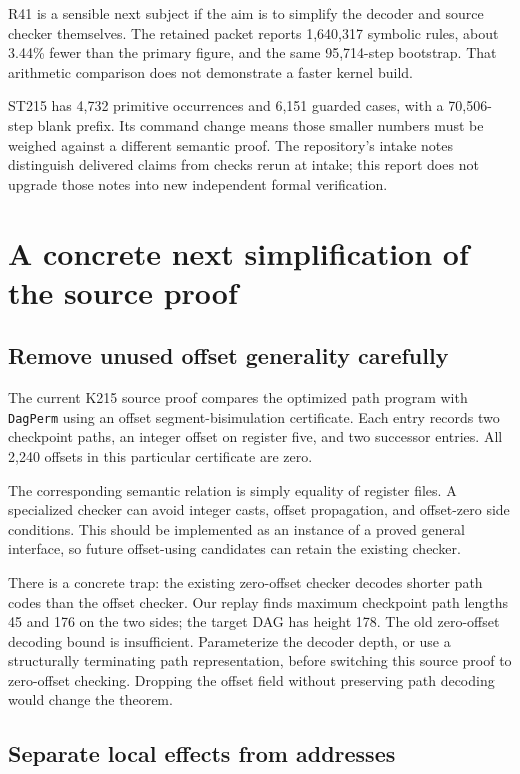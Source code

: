 \documentclass[11pt,letterpaper]{article}
\theoremstyle{definition}
\begin{document}
R41 is a sensible next subject if the aim is to simplify the decoder and
source checker themselves. The retained packet reports 1,640,317 symbolic
rules, about 3.44\% fewer than the primary figure, and the same 95,714-step
bootstrap. That arithmetic comparison does not demonstrate a faster
kernel build.\cite{rebalanced}

ST215 has 4,732 primitive occurrences and 6,151 guarded cases, with a
70,506-step blank prefix. Its command change means those smaller numbers
must be weighed against a different semantic proof. The repository's
intake notes distinguish delivered claims from checks rerun at intake;
this report does not upgrade those notes into new independent formal
verification.\cite{directtransfer,commands120,zerospare}

\section{A concrete next simplification of the source proof}

\subsection{Remove unused offset generality carefully}

The current K215 source proof compares the optimized path program with
\texttt{DagPerm} using an offset segment-bisimulation certificate. Each
entry records two checkpoint paths, an integer offset on register five,
and two successor entries. All 2,240 offsets in this particular
certificate are zero.\cite{sourceproof}

The corresponding semantic relation is simply equality of register
files. A specialized checker can avoid integer casts, offset propagation,
and offset-zero side conditions. This should be implemented as an
instance of a proved general interface, so future offset-using candidates
can retain the existing checker.

There is a concrete trap: the existing zero-offset checker decodes shorter
path codes than the offset checker. Our replay finds maximum checkpoint
path lengths 45 and 176 on the two sides; the target DAG has height 178.
The old zero-offset decoding bound is insufficient. Parameterize the
decoder depth, or use a structurally terminating path representation,
before switching this source proof to zero-offset checking. Dropping the
offset field without preserving path decoding would change the theorem.

\subsection{Separate local effects from addresses}
\end{document}
